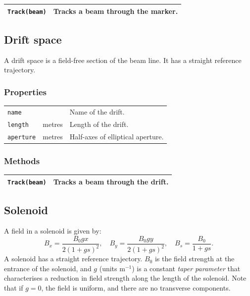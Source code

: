 \documentclass[11pt,twoside,a4paper]{article}
\begin{document}
\begin{tabular}{|l|l|}
\hline
\texttt{Track(beam)} & Tracks a beam through the marker. \\
\hline
\end{tabular}
\vspace{0.2in}


\subsection{Drift space}

A drift space is a field-free section of the beam line.  It has a straight
reference trajectory.

\subsubsection{Properties}

\begin{tabular}{|l|l|l|}
\hline
\texttt{name} & & Name of the drift. \\
\texttt{length} & metres & Length of the drift. \\
\texttt{aperture} & metres & Half-axes of elliptical aperture. \\
\hline
\end{tabular}
\vspace{0.2in}

\subsubsection{Methods}

\begin{tabular}{|l|l|}
\hline
\texttt{Track(beam)} & Tracks a beam through the drift. \\
\hline
\end{tabular}
\vspace{0.2in}


\subsection{Solenoid}

A field in a solenoid is given by:
\[
B_x = \frac{B_0 g x}{2\left( 1 + g s \right)^2}, \quad
B_y = \frac{B_0 g y}{2\left( 1 + g s \right)^2}, \quad
B_s = \frac{B_0}{1 + g s}.
\]
A solenoid has a straight reference trajectory.  $B_0$ is the field strength
at the entrance of the solenoid, and $g$ (units m$^{-1}$) is a constant
\emph{taper parameter} that characterises a reduction in field strength
along the length of the solenoid.  Note that if $g = 0$, the field is
uniform, and there are no transverse components.
\end{document}
